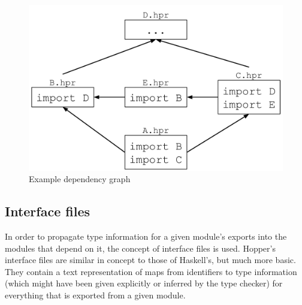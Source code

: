 \begin{figure}[h!]
\centering
  \includegraphics[width=0.6\pdfpagewidth]{figure/depgraph}
  \caption{Example dependency graph}
  \label{fig:depgraph}
\end{figure}

\subsection{Interface files}

In order to propagate type information for a given module's exports into the modules that depend on it, the concept of interface files is used. Hopper's interface files are similar in concept to those of Haskell's\cite{interfacefiles}, but much more basic. They contain a text representation of maps from identifiers to type information (which might have been given explicitly or inferred by the type checker) for everything that is exported from a given module.
